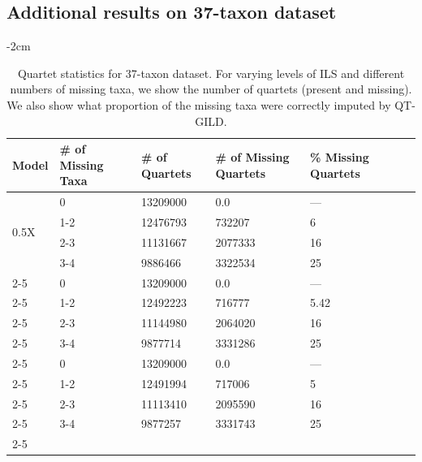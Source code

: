 \documentclass[10pt,a4paper]{article}
\begin{document}
\begin{appendices}
\subsection{Additional results on 37-taxon dataset}
\label{app:37-taxon}


% 
\begin{table}[H]
  \small
  \centering
    \addtolength{\leftskip} {-2cm} %
    \addtolength{\rightskip}{-2cm}
    \caption{Quartet statistics for 37-taxon dataset. For varying levels of ILS and different numbers of missing taxa, we show the number of quartets (present and missing). We also show what proportion of the missing taxa were correctly imputed by QT-GILD.}
    \label{tab:qstat-37}
\begin{tabularx}{1.2\textwidth}{|X|X|X|X|X|X|X|}


\hline
Model & \# of Missing Taxa & \# of Quartets  &  \# of Missing Quartets & \% Missing Quartets \\
    \hline \hline
    \multirow{4}{0.25\textwidth}{0.5X} 
    & 0   & 13209000 &    0.0    &   --- \\  \cline{2-5}
    & 1-2 & 12476793 &	732207
 	&	6\\ \cline{2-5}
    & 2-3 & 11131667 &    2077333	&	16 \\ \cline{2-5}
    & 3-4 & 9886466 &	  3322534   &	25 \\ \cline{2-5}
    \hline
    
    \multirow{4}{0.25\textwidth}{1X} 
    & 0   & 13209000 &    0.0     & --- \\  \cline{2-5}
    & 1-2 & 12492223 &	716777    & 5.42\\ \cline{2-5}
    & 2-3 & 11144980 &	2064020   & 16 \\ \cline{2-5}
    & 3-4 & 9877714  &	3331286   & 25 \\ \cline{2-5}
    \hline
    
    \multirow{4}{0.25\textwidth}{2X} 
    & 0   & 13209000 &    0.0     & --- \\  \cline{2-5}
    & 1-2 & 12491994 &	717006   & 5 \\ \cline{2-5}
    & 2-3 & 11113410 &	2095590   & 16 \\ \cline{2-5}
    & 3-4 & 9877257  &	3331743  & 25 \\ \cline{2-5}
    \hline
    
    
    



\end{tabularx}
\end{table}
\end{appendices}
\end{document}
